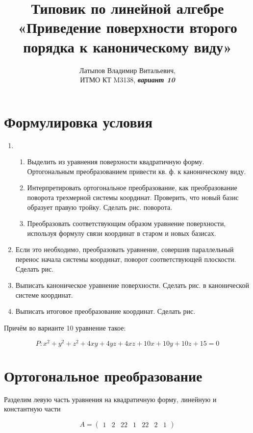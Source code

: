 \documentclass[12pt, a4paper]{article}
\author{Латыпов Владимир Витальевич, \\ ИТМО КТ M3138, \Huge{\textit{\textbf{вариант 10}}}}
\title{Типовик по линейной алгебре «Приведение поверхности второго порядка к каноническому виду»}
\begin{document}
    \tit

    \section{Формулировка условия}

    \begin{enumerate}
        \item \begin{enumerate}
            \item Выделить из уравнения поверхности квадратичную форму. Ортогональным
            преобразованием привести кв. ф. к каноническому виду.
            \item Интерпретировать ортогональное преобразование, как преобразование поворота
            трехмерной системы координат. Проверить, что новый базис образует правую тройку.
            Сделать рис. поворота.
            \item Преобразовать соответствующим образом уравнение поверхности, используя формулу
            связи координат в старом и новых базисах.    
        \end{enumerate}
        \item Если это необходимо, преобразовать уравнение, совершив параллельный перенос
        начала системы координат, поворот соответствующей плоскости. Сделать рис.
        \item Выписать каноническое уравнение поверхности. Сделать рис. в канонической системе
        координат.
        \item Выписать итоговое преобразование координат. Сделать рис.
    \end{enumerate} 

    Причём во варианте 10 уравнение такое: 

    \begin{equation}
        P: x^2 + y^2 + z^2 + 4 xy + 4 yz + 4 xz + 10 x + 10 y + 10 z + 15 = 0
    \end{equation}

    \section{Ортогональное преобразование}

    Разделим левую часть уравнения на квадратичную форму, линейную и константную части

    \begin{equation}
        A = \begin{pmatrix}
            1 & 2 & 2
            2 & 1 & 2
            2 & 2 & 1
        \end{pmatrix}
    \end{equation}
\end{document}

